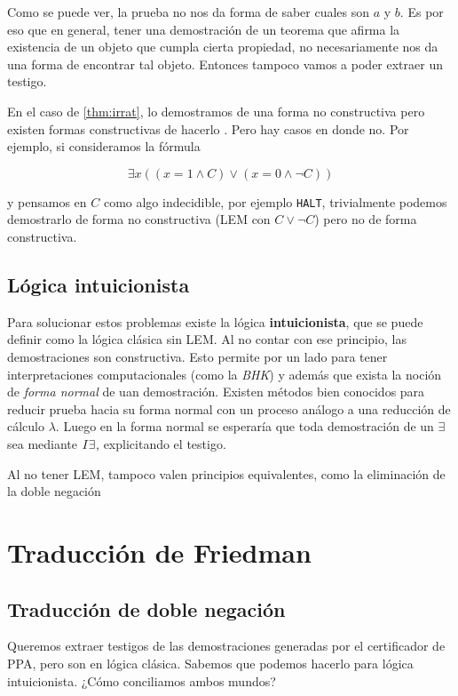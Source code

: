 Como se puede ver, la prueba no nos da forma de saber cuales son $a$ y $b$. Es
por eso que en general, tener una demostración de un teorema que afirma la
existencia de un objeto que cumpla cierta propiedad, no necesariamente nos da
una forma de encontrar tal objeto. Entonces tampoco vamos a poder extraer un
testigo.

En el caso de \ref{thm:irrat}, lo demostramos de una forma no constructiva pero
existen formas constructivas de hacerlo . Pero hay casos en donde
no. Por ejemplo, si consideramos la fórmula

\[
    \exists x ((x = 1 \wedge C) \vee (x = 0 \wedge \neg C))
\]

y pensamos en $C$ como algo indecidible, por ejemplo \texttt{HALT}, trivialmente
podemos demostrarlo de forma no constructiva (LEM con $C \vee \neg C$) pero no
de forma constructiva.

\subsection{Lógica intuicionista}

Para solucionar estos problemas existe la lógica \textbf{intuicionista}, que se
puede definir como la lógica clásica sin LEM. Al no contar con ese principio,
las demostraciones son constructiva. Esto permite por un lado para tener
interpretaciones computacionales (como la \textit{BHK}) y además que exista la
noción de \textit{forma normal} de uan demostración. Existen métodos bien
conocidos para reducir prueba hacia su
forma normal con un proceso análogo a una reducción de cálculo $\lambda$. Luego
en la forma normal se esperaría que toda demostración de un $\exists$ sea
mediante $I\exists$, explicitando el testigo.

Al no tener LEM, tampoco valen principios equivalentes, como la eliminación de
la doble negación 

\section{Traducción de Friedman}

\subsection{Traducción de doble negación}

Queremos extraer testigos de las demostraciones generadas por el certificador de
PPA, pero son en lógica clásica. Sabemos que podemos hacerlo para lógica
intuicionista. ¿Cómo conciliamos ambos mundos?

